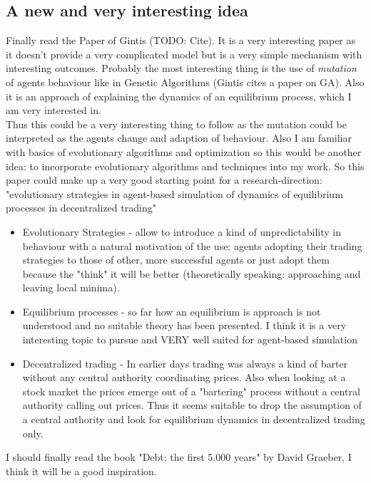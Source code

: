 \subsection*{A new and very interesting idea}
Finally read the Paper of Gintis (TODO: Cite). It is a very interesting paper as it doesn't provide a very complicated model but is a very simple mechanism with interesting outcomes. Probably the most interesting thing is the use of \textit{mutation} of agents behaviour like in Genetic Algorithms (Gintis cites a paper on GA). Also it is an approach of explaining the dynamics of an equilibrium process, which I am very interested in. \\
Thus this could be a very interesting thing to follow as the mutation could be interpreted as the agents change and adaption of behaviour. Also I am familiar with basics of evolutionary algorithms and optimization so this would be another idea: to incorporate evolutionary algorithms and techniques into my work. So this paper could make up a very good starting point for a research-direction: "evolutionary strategies in agent-based simulation of dynamics of equilibrium processes in decentralized trading"

\begin{itemize}
\item Evolutionary Strategies - allow to introduce a kind of unpredictability in behaviour with a natural motivation of the use: agents adopting their trading strategies to those of other, more successful agents or just adopt them because the "think" it will be better (theoretically speaking: approaching and leaving local minima).
\item Equilibrium processes - so far how an equilibrium is approach is not understood and no suitable theory has been presented. I think it is a very interesting topic to pursue and VERY well suited for agent-based simulation
\item Decentralized trading - In earlier days trading was always a kind of barter without any central authority coordinating prices. Also when looking at a stock market the prices emerge out of a "bartering" process without a central authority calling out prices. Thus it seems suitable to drop the assumption of a central authority and look for equilibrium dynamics in decentralized trading only.
\end{itemize}

I should finally read the book "Debt: the first 5.000 years" by David Graeber, I think it will be a good inspiration.

